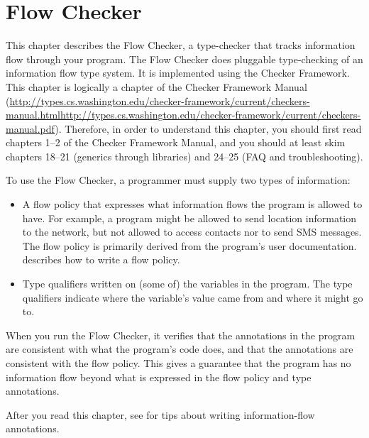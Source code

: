 \htmlhr
\chapter{Flow Checker\label{flow-checker}}
This chapter describes the Flow Checker, a type-checker that 
tracks information flow through your program.
The Flow Checker does pluggable type-checking of an information flow type
system.  It is implemented using the Checker Framework.  This chapter is
logically a chapter of the 
Checker Framework Manual (\ifhevea\url{http://types.cs.washington.edu/checker-framework/current/checkers-manual.html}\else\url{http://types.cs.washington.edu/checker-framework/current/checkers-manual.pdf}\fi).
Therefore, in order to understand this chapter, you should first read
chapters 1--2 of the Checker Framework Manual, and you should at least skim
chapters 18--21 (generics through libraries) and 24--25 (FAQ and
troubleshooting). 



To use the Flow Checker, a programmer must supply two types of
information:

\begin{itemize}
\item
A flow policy that expresses what information flows the program is allowed
to have.   For example, a program might be allowed to send location
information to the network, but not allowed to access contacts nor to send
SMS messages.  The flow policy is primarily derived from the program's user
documentation.   describes how to write a flow
policy.
\item
{}
Type qualifiers written on (some of) the variables in the program.  The
type qualifiers indicate where the variable's value came from and where it
might go to.
\end{itemize}

When you run the Flow Checker, it verifies that the annotations in the
program are consistent with what the program's code does, and that the
annotations are consistent with the flow policy.  This gives a guarantee
that the program has no information flow beyond what is expressed in the
flow policy and type annotations.



After you read this chapter, see  for tips about
writing information-flow annotations.


